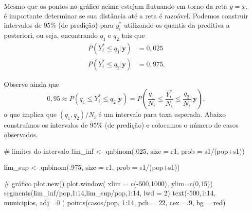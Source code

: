 \documentclass[
  letterpaper,
  DIV=11,
  numbers=noendperiod]{scrreprt}
\newenvironment{Shaded}{\begin{snugshade}}{\end{snugshade}}
\newcommand{\AttributeTok}[1]{\textcolor[rgb]{0.40,0.45,0.13}{#1}}
\newcommand{\CommentTok}[1]{\textcolor[rgb]{0.37,0.37,0.37}{#1}}
\newcommand{\DecValTok}[1]{\textcolor[rgb]{0.68,0.00,0.00}{#1}}
\newcommand{\FunctionTok}[1]{\textcolor[rgb]{0.28,0.35,0.67}{#1}}
\newcommand{\NormalTok}[1]{\textcolor[rgb]{0.00,0.23,0.31}{#1}}
\newcommand{\OtherTok}[1]{\textcolor[rgb]{0.00,0.23,0.31}{#1}}
\newcommand{\SpecialCharTok}[1]{\textcolor[rgb]{0.37,0.37,0.37}{#1}}
\newcommand{\StringTok}[1]{\textcolor[rgb]{0.13,0.47,0.30}{#1}}
\theoremstyle{plain}
\theoremstyle{definition}
\theoremstyle{definition}
\theoremstyle{remark}
\begin{document}
Mesmo que os pontos no gráfico acima estejam flutuando em torno da reta
\(y=x\), é importante determinar se sua distância até a reta é razoável.
Podemos construir intervalos de 95\% (de predição) para \(y^*_i\)
utilizando os quantis da preditiva a posteriori, ou seja, encontrando
\(q_1\) e \(q_2\) tais que \[\begin{align}
P(Y_i^*\leq q_1|\boldsymbol{y})&=0,025\\
P(Y_i^*\leq q_2|\boldsymbol{y})&=0,975.
\end{align}
\]

Observe ainda que
\[0,95\approx P(q_1\leq Y_i^*\leq q_2|\boldsymbol{y})=P\left(\frac{q_1}{N_i}\leq \frac{Y_i^*}{N_i}\leq \frac{q_2}{N_i}|\boldsymbol{y}\right),\]
o que implica que \((q_1,q_2)/N_i\) é um intervalo para taxa esperada.
Abaixo construímos os intervalos de 95\% (de predição) e colocamos o
número de casos observados.

\begin{Shaded}
\begin{Highlighting}[]
\CommentTok{\# limites do intervalo}
\NormalTok{lim\_inf }\OtherTok{\textless{}{-}} \FunctionTok{qnbinom}\NormalTok{(.}\DecValTok{025}\NormalTok{, }\AttributeTok{size =}\NormalTok{ r1, }\AttributeTok{prob =}\NormalTok{ s1}\SpecialCharTok{/}\NormalTok{(pop}\SpecialCharTok{+}\NormalTok{s1))}

\NormalTok{lim\_sup }\OtherTok{\textless{}{-}} \FunctionTok{qnbinom}\NormalTok{(.}\DecValTok{975}\NormalTok{, }\AttributeTok{size =}\NormalTok{ r1, }\AttributeTok{prob =}\NormalTok{ s1}\SpecialCharTok{/}\NormalTok{(pop}\SpecialCharTok{+}\NormalTok{s1))}

\CommentTok{\# gráfico}
\FunctionTok{plot.new}\NormalTok{()}
\FunctionTok{plot.window}\NormalTok{( }\AttributeTok{xlim =} \FunctionTok{c}\NormalTok{(}\SpecialCharTok{{-}}\DecValTok{500}\NormalTok{,}\DecValTok{1000}\NormalTok{), }\AttributeTok{ylim=}\FunctionTok{c}\NormalTok{(}\DecValTok{0}\NormalTok{,}\DecValTok{15}\NormalTok{))}
\FunctionTok{segments}\NormalTok{(lim\_inf}\SpecialCharTok{/}\NormalTok{pop,}\DecValTok{1}\SpecialCharTok{:}\DecValTok{14}\NormalTok{,lim\_sup}\SpecialCharTok{/}\NormalTok{pop,}\DecValTok{1}\SpecialCharTok{:}\DecValTok{14}\NormalTok{, }\AttributeTok{lwd =} \DecValTok{2}\NormalTok{)}
\FunctionTok{text}\NormalTok{(}\SpecialCharTok{{-}}\DecValTok{500}\NormalTok{,}\DecValTok{1}\SpecialCharTok{:}\DecValTok{14}\NormalTok{, municipios, }\AttributeTok{adj =}\DecValTok{0}\NormalTok{ )}
\FunctionTok{points}\NormalTok{(casos}\SpecialCharTok{/}\NormalTok{pop, }\DecValTok{1}\SpecialCharTok{:}\DecValTok{14}\NormalTok{, }\AttributeTok{pch =} \DecValTok{22}\NormalTok{, }\AttributeTok{cex =}\NormalTok{.}\DecValTok{9}\NormalTok{, }\AttributeTok{bg =} \StringTok{\textquotesingle{}red\textquotesingle{}}\NormalTok{)}
\end{Highlighting}
\end{Shaded}
\end{document}
